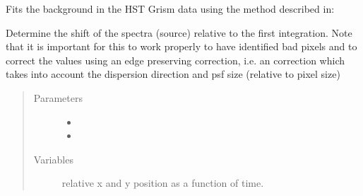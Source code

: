 \documentclass[a4paper,10pt,english]{sphinxmanual}
\begin{document}
\begin{fulllineitems}
\begin{fulllineitems}
\label{\detokenize{cascade.instruments:cascade.instruments.instruments.HSTWFC3._fit_background}}
Fits the background in the HST Grism data using the method described
in: 

\end{fulllineitems}


\begin{fulllineitems}
\label{\detokenize{cascade.instruments:cascade.instruments.instruments.HSTWFC3._determine_relative_source_position}}
Determine the shift of the spectra (source) relative to the first
integration. Note that it is important for this to work properly
to have identified bad pixels and to correct the values using an edge
preserving correction, i.e. an correction which takes into account
the dispersion direction and psf size (relative to pixel size)
\begin{quote}\begin{description}
\item[{Parameters}] \leavevmode\begin{itemize}
\item {} 
 \textendash{} 

\item {} 
 \textendash{} 

\end{itemize}

\item[{Variables}] \leavevmode
{} \textendash{} relative x and y position as a function of time.

\end{description}\end{quote}

\end{fulllineitems}



\end{fulllineitems}
\end{document}
